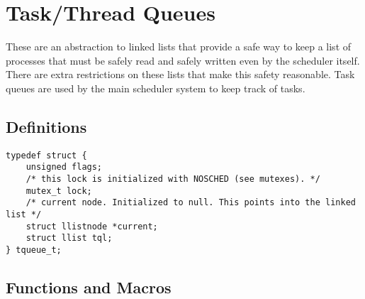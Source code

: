 \section{Task/Thread Queues}
These are an abstraction to linked lists that provide a safe way to
keep a list of processes that must be safely read and safely written
even by the scheduler itself. There are extra restrictions on these
lists that make this safety reasonable. Task queues are used by the main
scheduler system to keep track of tasks.
\subsection{Definitions}

\begin{lstlisting}
typedef struct {
	unsigned flags;
	/* this lock is initialized with NOSCHED (see mutexes). */
	mutex_t lock;
	/* current node. Initialized to null. This points into the linked list */
	struct llistnode *current;
	struct llist tql;
} tqueue_t;
\end{lstlisting}

\subsection{Functions and Macros}

